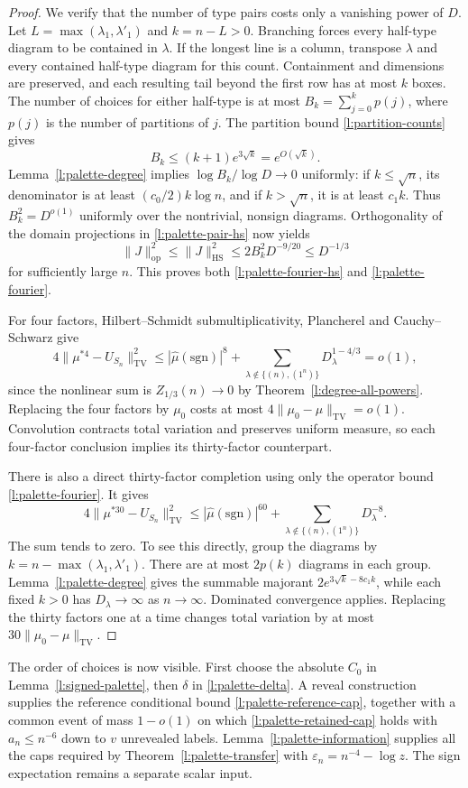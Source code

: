 \begin{proof}
We verify that the number of type pairs costs only a vanishing power
of $D$.  Let $L=\max(\lambda_1,\lambda'_1)$ and $k=n-L>0$.
Branching forces every half-type diagram to be contained in $\lambda$.
If the longest line is a column, transpose $\lambda$ and every contained
half-type diagram for this count.  Containment and dimensions are
preserved, and each resulting tail beyond the first row has at most
$k$ boxes.
The number of choices for either half-type is at most
$B_k=\sum_{j=0}^k p(j)$, where $p(j)$ is the number of partitions of
$j$.  The partition bound \eqref{l:partition-counts} gives
\[
 B_k\le(k+1)e^{3\sqrt k}=e^{O(\sqrt k)}.
\]
Lemma~\ref{l:palette-degree} implies
$\log B_k/\log D\to0$ uniformly: if $k\le\sqrt n$, its denominator
is at least $(c_0/2)k\log n$, and if $k>\sqrt n$, it is at least
$c_1k$.  Thus $B_k^2=D^{o(1)}$ uniformly over the nontrivial,
nonsign diagrams.  Orthogonality of the domain projections in
\eqref{l:palette-pair-hs} now yields
\[
 \|J\|_{\mathrm{op}}^2\le\|J\|_{\mathrm{HS}}^2
 \le 2B_k^2D^{-9/20}\le D^{-1/3}
\]
for sufficiently large $n$. This proves both
\eqref{l:palette-fourier-hs} and \eqref{l:palette-fourier}.

For four factors, Hilbert--Schmidt submultiplicativity, Plancherel
and Cauchy--Schwarz give
\[
 4\|\mu^{*4}-U_{S_n}\|_{\mathrm{TV}}^2
 \le |\widehat\mu(\mathrm{sgn})|^8
       +\sum_{\lambda\notin\{(n),(1^n)\}}D_\lambda^{1-4/3}
 =o(1),
\]
since the nonlinear sum is $Z_{1/3}(n)\to0$ by
Theorem~\ref{l:degree-all-powers}. Replacing the four factors by
$\mu_0$ costs at most $4\|\mu_0-\mu\|_{\mathrm{TV}}=o(1)$.
Convolution contracts total variation and preserves uniform measure,
so each four-factor conclusion implies its thirty-factor counterpart.

There is also a direct thirty-factor completion using only the
operator bound \eqref{l:palette-fourier}. It gives
\[
 4\|\mu^{*30}-U_{S_n}\|_{\mathrm{TV}}^2
 \le |\widehat\mu(\mathrm{sgn})|^{60}
       +\sum_{\lambda\notin\{(n),(1^n)\}}D_\lambda^{-8}.
\]
The sum tends to zero.  To see this directly, group the diagrams by
$k=n-\max(\lambda_1,\lambda'_1)$.  There are at most $2p(k)$
diagrams in each group.  Lemma~\ref{l:palette-degree} gives the
summable majorant $2e^{3\sqrt k-8c_1k}$, while each fixed $k>0$
has $D_\lambda\to\infty$ as $n\to\infty$.  Dominated convergence
applies.  Replacing the thirty factors one at a time changes total
variation by at most $30\|\mu_0-\mu\|_{\mathrm{TV}}$.
\end{proof}

The order of choices is now visible.  First choose the absolute
$C_0$ in Lemma~\ref{l:signed-palette}, then $\delta$ in
\eqref{l:palette-delta}.  A reveal construction supplies the reference
conditional bound \eqref{l:palette-reference-cap}, together with a
common event of mass $1-o(1)$ on which
\eqref{l:palette-retained-cap} holds with $a_n\le n^{-6}$ down to
$v$ unrevealed labels.  Lemma~\ref{l:palette-information}
supplies all the caps required by Theorem~\ref{l:palette-transfer}
with $\varepsilon_n=n^{-4}-\log z$.  The sign expectation remains a
separate scalar input.
